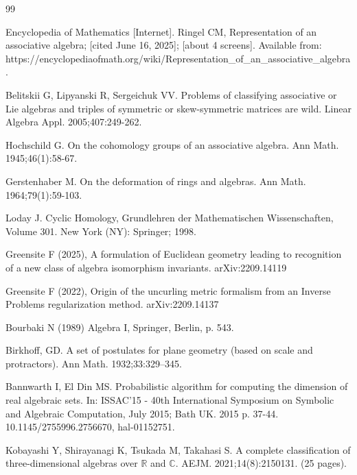 \documentclass{amsart}
\theoremstyle{definition}
\numberwithin{theorem}{section}
\numberwithin{equation}{section}
\begin{document}
\vspace{.75cm}



   \begin{thebibliography}{99}
   
 Encyclopedia of Mathematics [Internet].  Ringel CM, Representation of an associative algebra; [cited June 16, 2025]; [about 4 screens]. Available from: \\ https://encyclopediaofmath.org/wiki/Representation\_of\_an\_associative\_algebra.
          
        Belitskii G, Lipyanski R, Sergeichuk VV.  Problems of classifying associative or Lie algebras and triples of symmetric or skew-symmetric matrices are wild.  Linear Algebra Appl.  2005;407:249-262.
       
            Hochschild G.  On the cohomology groups of an associative algebra.   Ann Math.  1945;46(1):58-67.
       
             Gerstenhaber M.  On the deformation of rings and algebras.  Ann Math.  1964;79(1):59-103.
             
             Loday J. Cyclic Homology, Grundlehren der Mathematischen Wissenschaften, Volume 301.  New York (NY): Springer; 1998.              
            
             Greensite F (2025), A formulation of Euclidean geometry leading to recognition of a new class of algebra isomorphism invariants. arXiv:2209.14119

 Greensite F (2022), Origin of the uncurling metric formalism from an Inverse Problems regularization method. arXiv:2209.14137      

 Bourbaki N (1989) Algebra I, Springer, Berlin, p. 543.   

 Birkhoff, GD.  A set of postulates for plane geometry (based on scale and protractors).  Ann Math.  1932;33:329–345.               


 Bannwarth I, El Din MS.  Probabilistic algorithm for computing the dimension of real algebraic sets. In: ISSAC'15 - 40th International Symposium on Symbolic and Algebraic Computation, July 2015; Bath UK. 2015 p. 37-44.  10.1145/2755996.2756670, hal-01152751.     
                 
 Kobayashi Y, Shirayanagi K, Tsukada M, Takahasi S.  A complete classification of three-dimensional algebras over $\mathbb{R}$ and $\mathbb{C}$.  AEJM.   2021;14(8):2150131. (25 pages).


\end{thebibliography}
\end{document}
